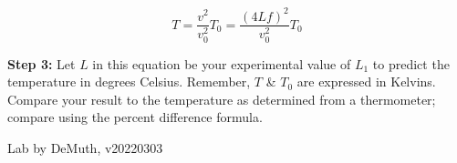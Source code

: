 \documentclass[14pt]{article}
\begin{document}
\begin{equation}
T=\frac{v^2}{v_0^2}T_0=\frac{(4Lf)^2}{v_0^2}T_0
\end{equation}

{\bf Step 3:} Let $L$ in this equation be your experimental value of $L_1$ to predict the temperature in degrees Celsius. 
Remember, $T$ \& $T_0$ are expressed in Kelvins. Compare your result to the temperature as determined from a thermometer; compare using the percent difference formula.



\vfill 
\centerline{\footnotesize Lab by DeMuth, v20220303}
\end{document}
